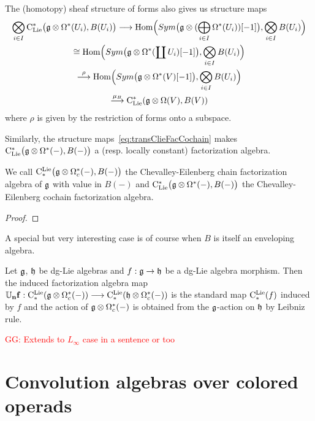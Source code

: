 \documentclass[11pt]{amsart}
\numberwithin{equation}{section}
\def\greg{\textcolor{red}{GG: }\textcolor{red}}
\begin{document}
\smallskip

The (homotopy) sheaf structure of forms also gives us structure maps
\begin{multline}\label{eq:transClieFacCochain}
 \bigotimes_{i\in I} {\rm C}_{\rm Lie}^*\big(\mathfrak g \otimes \Omega^*(U_i), B(U_i) \big) \longrightarrow
  {\rm Hom}\Big(Sym\big(\mathfrak g\otimes (\bigoplus_{i\in I}  \Omega^*(U_i))[-1]\big),  \bigotimes\limits_{i\in I} B(U_i) \Big) \\
 \cong {\rm Hom}\Big(Sym\big(\mathfrak g\otimes \Omega^*(\coprod U_i)[-1]\big), \bigotimes\limits_{i\in I} B(U_i) \Big) \\
 \stackrel{\rho}\longrightarrow {\rm Hom}\Big(Sym\big(\mathfrak g\otimes \Omega^*(V)[-1]\big), \bigotimes\limits_{i\in I} B(U_i) \Big) \\
 \stackrel{\mu_B}\longrightarrow 
  {\rm C}_{\rm Lie}^*(\mathfrak g\otimes \Omega (V), B(V))
\end{multline}
where $\rho$ is given by the restriction of forms onto a subspace. 

\label{L:ClieFacDef} 
 Similarly, the structure maps~\eqref{eq:transClieFacCochain} makes 
 $ {\rm C}_{\rm Lie}^*\big(\mathfrak g \otimes \Omega^*(-), B(-) \big)$ a (resp. locally constant) factorization algebra.

\begin{dfn}\label{dfn:CEofFact}
We {call   ${\rm C}^{\rm Lie}_*\big(\mathfrak g \otimes \Omega^*_c(-), B(-) \big)$ the Chevalley-Eilenberg chain factorization algebra of $\mathfrak g$ with value in $B(-)$} 
and ${\rm C}_{\rm Lie}^*\big(\mathfrak g \otimes \Omega^*(-), B(-) \big)$ the Chevalley-Eilenberg cochain factorization algebra.
\end{dfn}
\begin{proof}
 
\end{proof}


A special but very interesting case is of course when $B$ is itself an enveloping algebra. 
\begin{cor}
 Let $\mathfrak g$, $\mathfrak h$ be dg-Lie algebras and $f:\mathfrak g\to \mathfrak h$ be a dg-Lie algebra morphism. 
 Then the induced factorization algebra map $\mathbf{\mathbb U_n f}:  {\rm C}^{\rm Lie}_*( \mathfrak g \otimes \Omega^*_c(-)) \longrightarrow  {\rm C}^{\rm Lie}_*( \mathfrak h \otimes \Omega^*_c(-)) $
 is the standard map ${\rm C}^{\rm Lie}_*(f)$ induced by $f$ and the action of $\mathfrak g  \otimes \Omega^*_c(-)$ is obtained from the $\mathfrak g$-action on $\mathfrak h$ by Leibniz rule.
\end{cor}
\begin{rmk}\greg{Extends to $L_\infty$ case in a sentence or too}
\end{rmk}


\section{Convolution algebras over colored operads}
\end{document}
